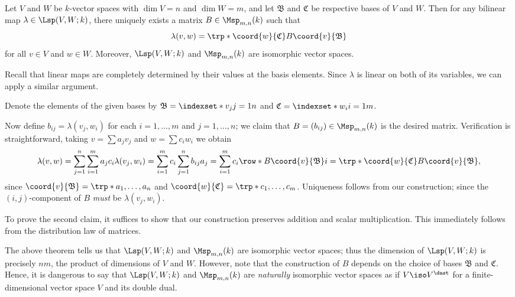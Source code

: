 \begin{theorem}
    \label{thm:blnrep}
    Let \(V\) and \(W\) be \(k\)-vector spaces
    with \(\dim V=n\) and \(\dim W=m\),
    and let \(\mathfrak B\) and \(\mathfrak C\) be respective bases
    of \(V\) and \(W\).
    Then for any bilinear map \(\lambda\in\Lsp(V,W;k)\),
    there uniquely exists a matrix \(B\in\Msp_{m,n}(k)\) such that
    \[
        \lambda(v,w)
        =\trp*{\coord{w}{\mathfrak C}}B\coord{v}{\mathfrak B}
    \]
    for all \(v\in V\) and \(w\in W\).
    Moreover,
    \(\Lsp(V,W;k)\) and \(\Msp_{m,n}(k)\) are isomorphic vector spaces.
\end{theorem}
\begin{sketch}
    Recall that
    linear maps are completely determined by their values
    at the basis elements.
    Since \(\lambda\) is linear on both of its variables,
    we can apply a similar argument.
\end{sketch}
\begin{myproof}
    Denote the elements of the given bases by
    \(\mathfrak B=\indexset*{v_j}{j=1}{n}\)
    and \(\mathfrak C=\indexset*{w_i}{i=1}{m}\).
    
    Now define \(b_{ij}=\lambda(v_j,w_i)\)
    for each \(i=1,\dots,m\) and \(j=1,\dots,n\);
    we claim that \(B=(b_{ij})\in\Msp_{m,n}(k)\) is the desired matrix.
    Verification is straightforward,
    taking \(v=\sum a_jv_j\) and \(w=\sum c_iw_i\) we obtain
    \begin{align*}
        \lambda(v,w)
        =\sum_{j=1}^{n}\sum_{i=1}^{m}a_jc_i\lambda(v_j,w_i)
        =\sum_{i=1}^{m}c_i\sum_{j=1}^{n}b_{ij}a_j
        =\sum_{i=1}^{m}c_i\row*{B\coord{v}{\mathfrak B}}{i}
        =\trp*{\coord{w}{\mathfrak C}}B\coord{v}{\mathfrak B},
    \end{align*}
    since \(\coord{v}{\mathfrak B}=\trp*{a_1,\dots,a_n}\)
    and \(\coord{w}{\mathfrak C}=\trp*{c_1,\dots,c_m}\).
    Uniqueness follows from our construction;
    since the \((i,j)\)-component of \(B\)
    \emph{must} be \(\lambda(v_j,w_i)\).

    To prove the second claim, it suffices to show that
    our construction preserves addition and scalar multiplication.
    This immediately follows from the distribution law of matrices.
\end{myproof}
\begin{remark}
    \label{rmk:blnrep}
    The above theorem tells us that
    \(\Lsp(V,W;k)\) and \(\Msp_{m,n}(k)\)
    are isomorphic vector spaces;
    thus the dimension of \(\Lsp(V,W;k)\) is precisely \(nm\),
    the product of dimensions of \(V\) and \(W\).
    However, note that the construction of \(B\) depends on
    the choice of bases \(\mathfrak B\) and \(\mathfrak C\).
    Hence, it is dangerous to say that
    \(\Lsp(V,W;k)\) and \(\Msp_{m,n}(k)\) are
    \emph{naturally} isomorphic vector spaces
    as if \(V\iso V^{\dast}\) for
    a finite-dimensional vector space \(V\) and its double dual.
\end{remark}